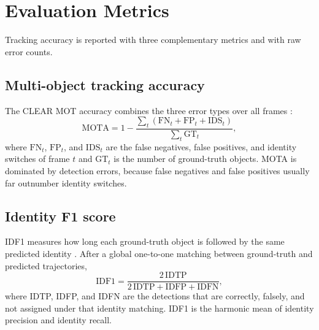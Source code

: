 \section{Evaluation Metrics}\label{sec:m-metrics}
Tracking accuracy is reported with three complementary metrics and with raw error counts.

\subsection{Multi-object tracking accuracy}
The CLEAR MOT accuracy combines the three error types over all frames \cite{bernardin2008clear}:
\begin{equation}
\mathrm{MOTA} = 1 - \frac{\sum_t \left(\mathrm{FN}_t + \mathrm{FP}_t + \mathrm{IDS}_t\right)}{\sum_t \mathrm{GT}_t},
\label{eq:m-mota}
\end{equation}
where $\mathrm{FN}_t$, $\mathrm{FP}_t$, and $\mathrm{IDS}_t$ are the false negatives, false positives, and identity switches of frame $t$ and $\mathrm{GT}_t$ is the number of ground-truth objects. MOTA is dominated by detection errors, because false negatives and false positives usually far outnumber identity switches.

\subsection{Identity F1 score}
IDF1 measures how long each ground-truth object is followed by the same predicted identity \cite{ristani2016idf1}. After a global one-to-one matching between ground-truth and predicted trajectories,
\begin{equation}
\mathrm{IDF1} = \frac{2\,\mathrm{IDTP}}{2\,\mathrm{IDTP} + \mathrm{IDFP} + \mathrm{IDFN}},
\label{eq:m-idf1}
\end{equation}
where IDTP, IDFP, and IDFN are the detections that are correctly, falsely, and not assigned under that identity matching. IDF1 is the harmonic mean of identity precision and identity recall.

